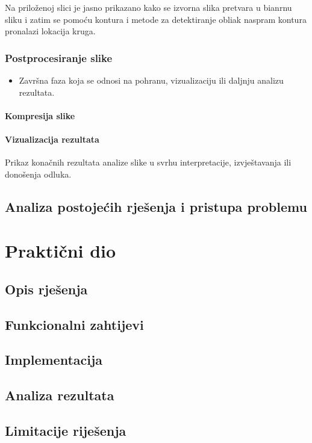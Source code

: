 \documentclass{foi}
\begin{document}
Na priloženoj slici je jasno prikazano kako se izvorna slika pretvara u bianrnu sliku i zatim se pomoću kontura i metode za detektiranje obliak naspram kontura pronalazi lokacija kruga.

\subsection{Postprocesiranje slike}
\begin{itemize}
    \item Završna faza koja se odnosi na pohranu, vizualizaciju ili daljnju analizu rezultata.
\end{itemize}

\subsubsection{Kompresija slike}

\subsubsection{Vizualizacija rezultata}
Prikaz konačnih rezultata analize slike u svrhu interpretacije, izvještavanja ili donošenja odluka.

\section{Analiza postojećih rješenja i pristupa problemu}

\chapter{Praktični dio}
\section{Opis rješenja}
\section{Funkcionalni zahtijevi}
\section{Implementacija}
\section{Analiza rezultata}
\section{Limitacije riješenja}
\end{document}
